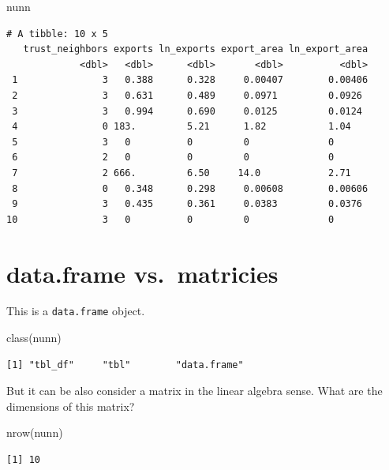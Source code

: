 \documentclass[
  letterpaper,
]{book}
\newenvironment{Shaded}{\begin{snugshade}}{\end{snugshade}}
\newcommand{\FunctionTok}[1]{\textcolor[rgb]{0.28,0.35,0.67}{#1}}
\newcommand{\NormalTok}[1]{\textcolor[rgb]{0.00,0.23,0.31}{#1}}
\theoremstyle{definition}
\theoremstyle{definition}
\theoremstyle{plain}
\theoremstyle{definition}
\theoremstyle{plain}
\theoremstyle{plain}
\theoremstyle{remark}
\begin{document}
\begin{Shaded}
\begin{Highlighting}[]
\NormalTok{nunn}
\end{Highlighting}
\end{Shaded}

\begin{verbatim}
# A tibble: 10 x 5
   trust_neighbors exports ln_exports export_area ln_export_area
             <dbl>   <dbl>      <dbl>       <dbl>          <dbl>
 1               3   0.388      0.328     0.00407        0.00406
 2               3   0.631      0.489     0.0971         0.0926 
 3               3   0.994      0.690     0.0125         0.0124 
 4               0 183.         5.21      1.82           1.04   
 5               3   0          0         0              0      
 6               2   0          0         0              0      
 7               2 666.         6.50     14.0            2.71   
 8               0   0.348      0.298     0.00608        0.00606
 9               3   0.435      0.361     0.0383         0.0376 
10               3   0          0         0              0      
\end{verbatim}

\hypertarget{data.frame-vs.-matricies}{%
\section{data.frame vs.~matricies}\label{data.frame-vs.-matricies}}

This is a \texttt{data.frame} object.

\begin{Shaded}
\begin{Highlighting}[]
\FunctionTok{class}\NormalTok{(nunn)}
\end{Highlighting}
\end{Shaded}

\begin{verbatim}
[1] "tbl_df"     "tbl"        "data.frame"
\end{verbatim}

But it can be also consider a matrix in the linear algebra sense. What
are the dimensions of this matrix?

\begin{Shaded}
\begin{Highlighting}[]
\FunctionTok{nrow}\NormalTok{(nunn)}
\end{Highlighting}
\end{Shaded}

\begin{verbatim}
[1] 10
\end{verbatim}
\end{document}
